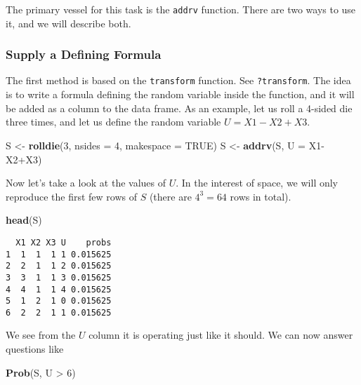 \documentclass[]{book}
\newenvironment{Shaded}{\begin{snugshade}}{\end{snugshade}}
\newcommand{\KeywordTok}[1]{\textcolor[rgb]{0.13,0.29,0.53}{\textbf{{#1}}}}
\newcommand{\DataTypeTok}[1]{\textcolor[rgb]{0.13,0.29,0.53}{{#1}}}
\newcommand{\DecValTok}[1]{\textcolor[rgb]{0.00,0.00,0.81}{{#1}}}
\newcommand{\StringTok}[1]{\textcolor[rgb]{0.31,0.60,0.02}{{#1}}}
\newcommand{\OtherTok}[1]{\textcolor[rgb]{0.56,0.35,0.01}{{#1}}}
\newcommand{\NormalTok}[1]{{#1}}
\numberwithin{equation}{chapter}
\numberwithin{figure}{chapter}
\theoremstyle{plain}
\theoremstyle{definition}
\theoremstyle{remark}
\theoremstyle{definition}
\theoremstyle{definition}
\theoremstyle{remark}
\begin{document}
The primary vessel for this task is the \texttt{addrv} function. There
are two ways to use it, and we will describe both.

\subsubsection{Supply a Defining
Formula}\label{supply-a-defining-formula}

The first method is based on the \texttt{transform} function. See
\texttt{?transform}. The idea is to write a formula defining the random
variable inside the function, and it will be added as a column to the
data frame. As an example, let us roll a 4-sided die three times, and
let us define the random variable \(U=X1-X2+X3\).

\begin{Shaded}
\begin{Highlighting}[]
\NormalTok{S <-}\StringTok{ }\KeywordTok{rolldie}\NormalTok{(}\DecValTok{3}\NormalTok{, }\DataTypeTok{nsides =} \DecValTok{4}\NormalTok{, }\DataTypeTok{makespace =} \OtherTok{TRUE}\NormalTok{) }
\NormalTok{S <-}\StringTok{ }\KeywordTok{addrv}\NormalTok{(S, }\DataTypeTok{U =} \NormalTok{X1-X2+X3) }
\end{Highlighting}
\end{Shaded}

Now let's take a look at the values of \(U\). In the interest of space,
we will only reproduce the first few rows of \(S\) (there are
\(4^{3}=64\) rows in total).

\begin{Shaded}
\begin{Highlighting}[]
\KeywordTok{head}\NormalTok{(S)}
\end{Highlighting}
\end{Shaded}

\begin{verbatim}
  X1 X2 X3 U    probs
1  1  1  1 1 0.015625
2  2  1  1 2 0.015625
3  3  1  1 3 0.015625
4  4  1  1 4 0.015625
5  1  2  1 0 0.015625
6  2  2  1 1 0.015625
\end{verbatim}

We see from the \(U\) column it is operating just like it should. We can
now answer questions like

\begin{Shaded}
\begin{Highlighting}[]
\KeywordTok{Prob}\NormalTok{(S, U >}\StringTok{ }\DecValTok{6}\NormalTok{) }
\end{Highlighting}
\end{Shaded}
\end{document}
